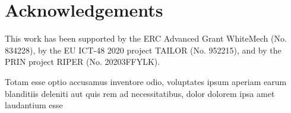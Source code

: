 \documentclass[letterpaper]{article} %
\theoremstyle{plain}
\theoremstyle{definition}
\theoremstyle{remark}
\begin{document}
\section*{Acknowledgements}
This work has been supported by the ERC Advanced Grant WhiteMech (No. 834228),
by the EU ICT-48 2020 project TAILOR (No. 952215), and by the PRIN project
RIPER (No. 20203FFYLK).

Totam esse optio accusamus inventore odio, voluptates ipsum aperiam earum blanditiis deleniti aut quis rem ad necessitatibus, dolor dolorem ipsa amet laudantium esse

\end{document}
